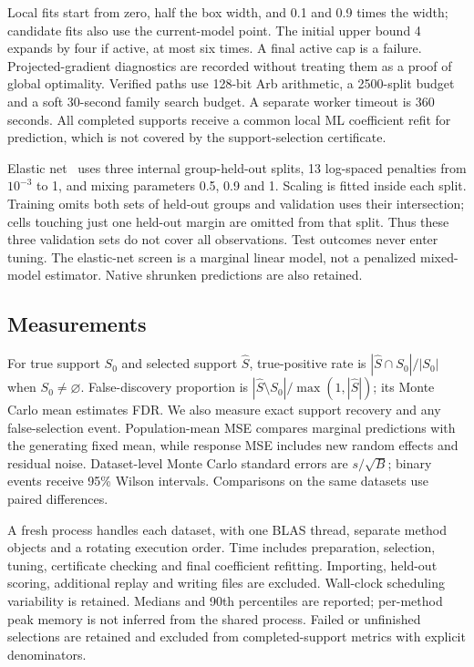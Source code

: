 \documentclass[preprint,11pt,numbers]{elsarticle}
\theoremstyle{remark}\newtheorem{remark}[theorem]{Remark}
\begin{document}
Local fits start from zero, half the box width, and 0.1 and 0.9 times the width;
candidate fits also use the current-model point. The initial upper bound 4
expands by four if active, at most six times. A final active cap is a failure.
Projected-gradient diagnostics are recorded without treating them as a proof
of global optimality. Verified paths use 128-bit Arb arithmetic, a 2500-split
budget and a soft 30-second family search budget. A separate worker timeout is
360 seconds. All completed supports receive a common local ML coefficient
refit for prediction, which is not covered by the support-selection certificate.

Elastic net~\cite{sklearnenet} uses three internal group-held-out splits,
13 log-spaced penalties from $10^{-3}$ to 1, and mixing parameters 0.5, 0.9
and 1. Scaling is fitted inside each split. Training omits both sets of held-out
groups and validation uses their intersection; cells touching just one held-out
margin are omitted from that split. Thus these three validation sets do not
cover all observations. Test outcomes never enter tuning. The elastic-net
screen is a marginal linear model, not a penalized mixed-model estimator.
Native shrunken predictions are also retained.

\subsection{Measurements}
For true support $S_0$ and selected support $\widehat S$, true-positive rate is
$|\widehat S\cap S_0|/|S_0|$ when $S_0\ne\varnothing$. False-discovery proportion
is $|\widehat S\setminus S_0|/\max(1,|\widehat S|)$; its Monte Carlo mean estimates
FDR. We also measure exact support recovery and any false-selection event.
Population-mean MSE compares marginal predictions with the generating fixed
mean, while response MSE includes new random effects and residual noise.
Dataset-level Monte Carlo standard errors are $s/\sqrt B$; binary events receive
95\% Wilson intervals. Comparisons on the same datasets use paired differences.

A fresh process handles each dataset, with one BLAS thread, separate method
objects and a rotating execution order. Time includes preparation, selection,
tuning, certificate checking and final coefficient refitting. Importing,
held-out scoring, additional replay and writing files are excluded. Wall-clock
scheduling variability is retained. Medians and 90th percentiles are reported;
per-method peak memory is not inferred from the shared process. Failed or
unfinished selections are retained and excluded from completed-support metrics
with explicit denominators.
\end{document}
